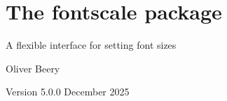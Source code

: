 \documentclass{article}
\begin{document}
\section*{The \textsf{fontscale} package}

A flexible interface for setting font sizes

Oliver Beery

Version 5.0.0 December 2025

\end{document}
